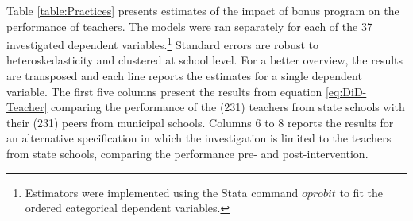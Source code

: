 \documentclass[a4paper, 12pt]{article}
\begin{document}
Table \ref{table:Practices} presents estimates of the impact of bonus program on the performance of teachers. The models were ran separately for each of the 37 investigated dependent variables.\footnote{Estimators were implemented using the Stata command $oprobit$ to fit the ordered categorical dependent variables.}  Standard errors are robust to heteroskedasticity and clustered at school level. For a better overview, the results are transposed and each line reports the estimates for a single dependent variable. The first five columns present the results from equation \eqref{eq:DiD-Teacher} comparing the performance of the (231) teachers from state schools with their (231) peers from municipal schools. Columns 6 to 8 reports the results for an alternative specification in which the investigation is limited to the teachers from state schools, comparing the performance pre- and post-intervention.






\vspace{15pt}

\end{document}
